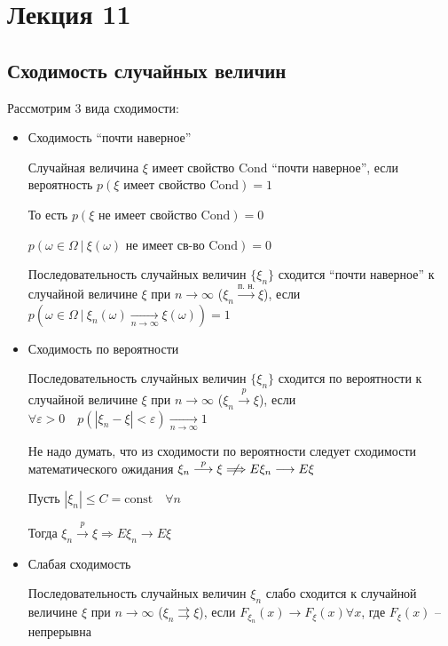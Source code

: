 \documentclass[12pt]{article}
\begin{document}
    \section{Лекция 11}

    \subsection{Сходимость случайных величин}

    \hypertarget{convergencetypes}{}

    Рассмотрим 3 вида сходимости:

    \begin{itemize}
        \item Сходимость \enquote{почти наверное}

        \Defs Случайная величина $\xi$ имеет свойство $\mathrm{Cond}$ \enquote{почти наверное}, если вероятность $p(\xi \text{ имеет свойство } \mathrm{Cond}) = 1$
    
        \Nota То есть $p(\xi \text{ не имеет свойство } \mathrm{Cond}) = 0$

        $p(\omega \in \Omega \ | \ \xi(\omega) \text{ не имеет св-во } \mathrm{Cond}) = 0$

        \Def Последовательность случайных величин $\{\xi_n\}$ сходится \enquote{почти наверное} к случайной величине $\xi$ при $n \to \infty$ ($\xi_n \overset{\text{п. н.}}{\longrightarrow} \xi$), 
        если $p(\omega \in \Omega \ | \ \xi_n(\omega) \underset{n \to \infty}{\longrightarrow} \xi(\omega)) = 1$

        \item Сходимость по вероятности

        \Defs Последовательность случайных величин $\{\xi_n\}$ сходится по вероятности к случайной величине $\xi$ при $n \to \infty$
        ($\xi_n \overset{p}{\longrightarrow} \xi$), если $\forall \varepsilon > 0 \quad p(|\xi_n - \xi| < \varepsilon) \underset{n \to \infty}{\longrightarrow} 1$
        
        \Nota Не надо думать, что из сходимости по вероятности следует сходимости математического ожидания $\xi_n \overset{p}{\longrightarrow} \xi \centernot{\Longrightarrow} E\xi_n \longrightarrow E\xi$

        \begin{MyTheorem}
            \Ths Пусть $|\xi_n| \leq C = \mathrm{const} \quad \forall n$

            Тогда $\xi_n \overset{p}{\longrightarrow} \xi \Longrightarrow E\xi_n \longrightarrow E\xi$
        \end{MyTheorem}

        \item Слабая сходимость

        \Defs Последовательность случайных величин $\xi_n$ слабо сходится к случайной величине $\xi$ при $n \to \infty$
        ($\xi_n \rightrightarrows \xi$), если $F_{\xi_n}(x) \longrightarrow F_\xi(x) \forall x$, где $F_\xi(x)$ -- непрерывна
    
    \end{itemize}
\end{document}

